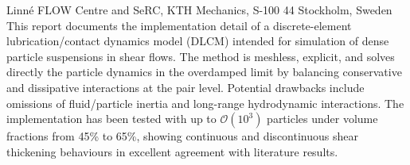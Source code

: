 %
%
%
%
%
%
%
\paperaffiliation
{%
  Linn\'e FLOW Centre and SeRC, KTH Mechanics, S-100 44 Stockholm, Sweden%
}%
%
%
%
\papervolume{}%
%
\papernumber{}
%
\paperpages{}%
%
\paperyear{}%
%
\papersummary%
{%
   This report documents the implementation detail of a discrete-element lubrication/contact dynamics model (DLCM) intended for simulation of dense particle suspensions in shear flows. The method is meshless, explicit, and solves directly the particle dynamics in the overdamped limit by balancing conservative and dissipative interactions at the pair level. Potential drawbacks include omissions of fluid/particle inertia and long-range hydrodynamic interactions. The implementation has been tested with up to $\mathcal{O}(10^3)$ particles under volume fractions from 45\% to 65\%, showing continuous and discontinuous shear thickening behaviours in excellent agreement with literature results.
}%
%
\graphicspath{{paper7/}}%
%
%
%
